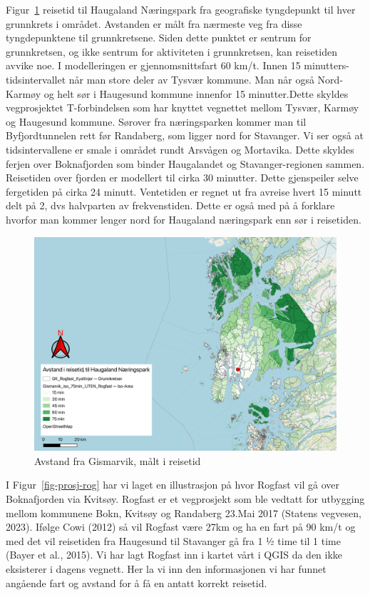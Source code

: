 \documentclass[
]{article}
\begin{document}
Figur~\ref{fig-rtid} reisetid til Haugaland Næringspark fra geografiske
tyngdepunkt til hver grunnkrets i området. Avstanden er målt fra
nærmeste veg fra disse tyngdepunktene til grunnkretsene. Siden dette
punktet er sentrum for grunnkretsen, og ikke sentrum for aktiviteten i
grunnkretsen, kan reisetiden avvike noe. I modelleringen er
gjennomsnittsfart 60 km/t. Innen 15 minutters-tidsintervallet når man
store deler av Tysvær kommune. Man når også Nord-Karmøy og helt sør i
Haugesund kommune innenfor 15 minutter.Dette skyldes vegprosjektet
T-forbindelsen som har knyttet vegnettet mellom Tysvær, Karmøy og
Haugesund kommune. Sørover fra næringsparken kommer man til
Byfjordtunnelen rett før Randaberg, som ligger nord for Stavanger. Vi
ser også at tidsintervallene er smale i området rundt Arsvågen og
Mortavika. Dette skyldes ferjen over Boknafjorden som binder Haugalandet
og Stavanger-regionen sammen. Reisetiden over fjorden er modellert til
cirka 30 minutter. Dette gjenspeiler selve fergetiden på cirka 24
minutt. Ventetiden er regnet ut fra avreise hvert 15 minutt delt på 2,
dvs halvparten av frekvenstiden. Dette er også med på å forklare hvorfor
man kommer lenger nord for Haugaland næringspark enn sør i reisetiden.

\begin{figure}[H]

{\centering \includegraphics{bilder/reisetid_ferje.png}

}

\caption{\label{fig-rtid}Avstand fra Gismarvik, målt i reisetid}

\end{figure}

I Figur~\ref{fig-prosj-rog} har vi laget en illustrasjon på hvor Rogfast
vil gå over Boknafjorden via Kvitsøy. Rogfast er et vegprosjekt som ble
vedtatt for utbygging mellom kommunene Bokn, Kvitsøy og Randaberg 23.Mai
2017 (Statens vegvesen, 2023). Ifølge Cowi (2012) så vil Rogfast være
27km og ha en fart på 90 km/t og med det vil reisetiden fra Haugesund
til Stavanger gå fra 1 ½ time til 1 time (Bayer et al., 2015). Vi har
lagt Rogfast inn i kartet vårt i QGIS da den ikke eksisterer i dagens
vegnett. Her la vi inn den informasjonen vi har funnet angående fart og
avstand for å få en antatt korrekt reisetid.
\end{document}
